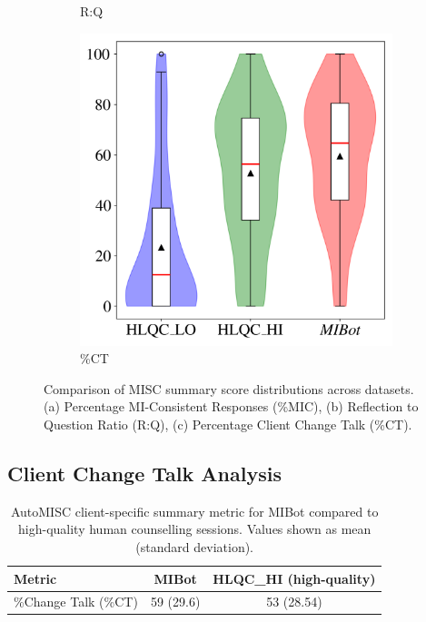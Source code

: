\begin{figure}[ht]
\begin{subfigure}[b]{0.32\textwidth}
    \caption{R:Q}
  \end{subfigure}
  \hfill
  \begin{subfigure}[b]{0.32\textwidth}
    \centering
    \includegraphics[width=\textwidth]{fig/ct.png}
    \caption{\%CT}
  \end{subfigure}
  \caption{Comparison of MISC summary score distributions across datasets. (a) Percentage MI-Consistent Responses (\%MIC), (b) Reflection to Question Ratio (R:Q), (c) Percentage Client Change Talk (\%CT).}
  \label{fig:misc_distributions}
\end{figure}


\subsection{Client Change Talk Analysis}



\begin{table}[ht]
  \centering
  \small
  \setlength{\tabcolsep}{4pt}
  \renewcommand{\arraystretch}{1.1}
  \begin{tabular}{@{}lcc@{}}
    \toprule
    \textbf{Metric} & \textbf{MIBot} & \textbf{HLQC\_HI (high-quality)} \\
    \midrule
    \%Change Talk (\%CT) & 59 (29.6) & 53 (28.54) \\
    \bottomrule
  \end{tabular}
  \caption{AutoMISC client-specific summary metric for MIBot compared to high-quality human counselling sessions. Values shown as mean (standard deviation).}
  \label{table:automisc_summary_client}
\end{table}


